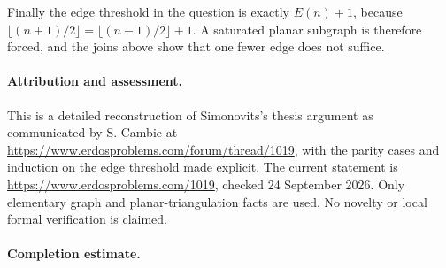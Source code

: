 Finally the edge threshold in the question is exactly \(E(n)+1\), because
\(\lfloor(n+1)/2\rfloor=\lfloor(n-1)/2\rfloor+1\). A saturated planar subgraph is therefore forced, and the joins above show that one fewer edge does not suffice.

\paragraph{Attribution and assessment.}
This is a detailed reconstruction of Simonovits's thesis argument as communicated by S. Cambie at \url{https://www.erdosproblems.com/forum/thread/1019}, with the parity cases and induction on the edge threshold made explicit. The current statement is \url{https://www.erdosproblems.com/1019}, checked 24 September 2026. Only elementary graph and planar-triangulation facts are used. No novelty or local formal verification is claimed.

\paragraph{Completion estimate.}
